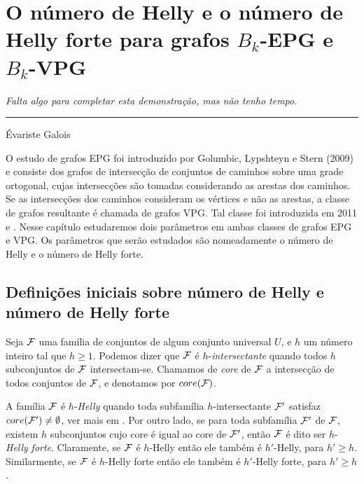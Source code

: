 \chapter{O número de Helly e o número de Helly forte para grafos $B_k$-EPG e $B_k$-VPG}


\begin{flushright}
\begin{minipage}[t][0cm][b]{0.47\textwidth}
\emph{
Falta algo para completar esta demonstração, mas não tenho tempo.}
\end{minipage}

\rule[0cm]{7cm}{0.03cm}%

Évariste Galois
\end{flushright}




O estudo de grafos EPG foi introduzido por  Golumbic, Lypshteyn e Stern (2009) e consiste dos grafos de intersecção de conjuntos de caminhos sobre uma grade ortogonal, cujas intersecções são tomadas considerando as arestas dos caminhos. Se as intersecções dos caminhos consideram os vértices e não as arestas, a classe de grafos resultante é chamada de grafos VPG. Tal classe foi introduzida em 2011 \cite{asinowski2011string} e \cite{asinowski2012}. Nesse capítulo estudaremos dois parâmetros em ambas classes de grafos EPG e VPG. Os parâmetros que serão estudados são nomeadamente o número de Helly e o número de Helly forte.

\section{Definições iniciais sobre número de Helly e número de Helly forte}

Seja  $\cal {F}$ uma família de conjuntos de algum conjunto universal $U$, e $h$ um número inteiro tal que $h\geq 1$. Podemos dizer que $\cal{F}$ é $h$-{\it intersectante} quando todos  $h$ subconjuntos de $\cal {F}$ intersectam-se. Chamamos de {\it core} de $\cal {F}$ a intersecção de todos conjuntos de $\cal {F}$, e denotamos por $core(\cal F)$. 

A família $\cal{F}$ é $h$-{\it Helly} quando toda subfamília $h$-intersectante $\cal{F'}$ satisfaz $core(\cal{F'}) \neq \emptyset$, ver mais em \cite{duchet1978propriete}. Por outro lado, se para toda subfamília $\cal{F'}$ de $\cal{F}$, existem $h$ subconjuntos cujo core é igual ao core de  $\cal {F'}$, então $\cal {F}$ é dito ser  $h$-{\it Helly} {\it forte}. Claramente, se $\cal {F}$ é $h$-Helly então ele também é $h'$-Helly, para $h' \geq h$. Similarmente, se ${\cal F}$ é $h$-Helly forte então ele também é $h'$-Helly forte, para $h' \geq h$. 

